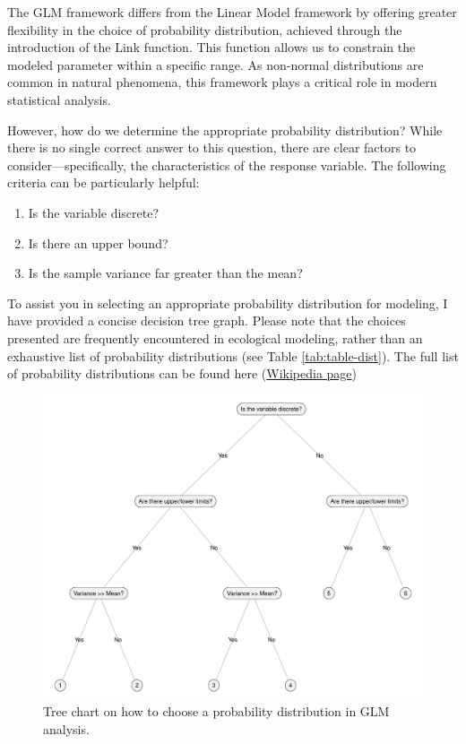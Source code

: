 \documentclass[
]{article}
\providecommand{\tightlist}{%
  \setlength{\itemsep}{0pt}\setlength{\parskip}{0pt}}
\begin{document}
The GLM framework differs from the Linear Model framework by offering greater flexibility in the choice of probability distribution, achieved through the introduction of the Link function. This function allows us to constrain the modeled parameter within a specific range. As non-normal distributions are common in natural phenomena, this framework plays a critical role in modern statistical analysis.

However, how do we determine the appropriate probability distribution? While there is no single correct answer to this question, there are clear factors to consider---specifically, the characteristics of the response variable. The following criteria can be particularly helpful:

\begin{enumerate}
\def\labelenumi{\arabic{enumi}.}
\tightlist
\item
  Is the variable discrete?
\item
  Is there an upper bound?
\item
  Is the sample variance far greater than the mean?
\end{enumerate}

To assist you in selecting an appropriate probability distribution for modeling, I have provided a concise decision tree graph. Please note that the choices presented are frequently encountered in ecological modeling, rather than an exhaustive list of probability distributions (see Table \ref{tab:table-dist}). The full list of probability distributions can be found here (\href{https://en.wikipedia.org/wiki/List_of_probability_distributions}{Wikipedia page})

\begin{figure}

{\centering \includegraphics[width=41.67in]{image/figure_dendro} 

}

\caption{Tree chart on how to choose a probability distribution in GLM analysis.}\label{fig:dendrogram}
\end{figure}
\end{document}

